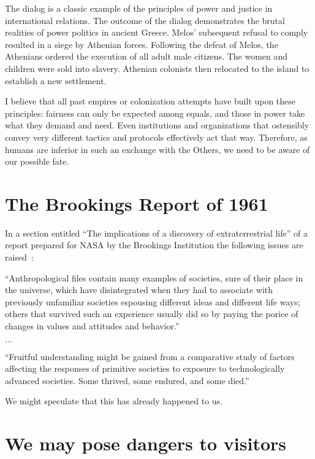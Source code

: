 The dialog is a classic example of the principles of power and justice in international relations. The outcome of the dialog demonstrates the brutal realities of power politics in ancient Greece. Melos' subsequent refusal to comply resulted in a siege by Athenian forces. Following the defeat of Melos, the Athenians ordered the execution of all adult male citizens. The women and children were sold into slavery. Athenian colonists then relocated to the island to establish a new settlement.

I believe that all past empires or colonization attempts have built upon these principles: fairness can only be expected among equals, and those in power take what they demand and need. Even institutions and organizations that ostensibly convey very different tactics and protocols effectively act that way. Therefore, as humans are inferior in such an exchange with the Others, we need to be aware of our possible fate.

\section{The Brookings Report of 1961}

In a section entitled ``The implications of a discovery of extraterrestrial life''
of a report prepared for NASA by the Brookings Institution
the following issues are raised~\cite[p.~215 and Footnote~37, p.~226]{MichaelDonald1961}:
\begin{svgraybox}
``Anthropological files contain many examples of societies, sure of their place in the universe,
which have disintegrated when they had to associate with previously unfamiliar societies
espousing different ideas and different life ways; others that survived such an experience usually did so
by paying the porice of changes in values and attitudes and behavior.''

$\ldots$

``Fruitful understanding might be gained from a comparative
study of factors affecting the responses of primitive societies to exposure to
technologically advanced societies. Some thrived, some endured, and some died.''
\end{svgraybox}

We might speculate that this has already happened to us.

\section{We may pose dangers to visitors}

